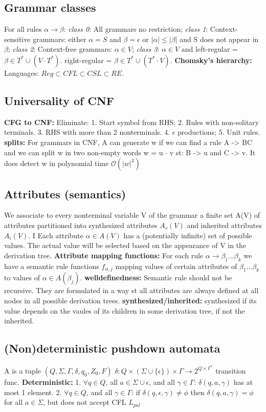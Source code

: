 \subsection*{Grammar classes}
For all rules $\alpha \rightarrow \beta$: \textit{class 0}: All grammars no restriction; \textit{class 1}: Context-sensitive grammars: either $\alpha = S$ and $\beta = \epsilon$ or $|\alpha| \leqslant |\beta|$ and S does not appear in $\beta$; \textit{class 2}: Context-free grammars: $\alpha \in V$; \textit{class 3}: $\alpha \in V$ and left-regular = $\beta \in T^* \cup (V \cdot T^*)$. right-regular = $\beta \in T^* \cup (T^* \cdot V)$. \textbf{Chomsky’s hierarchy:} Languages: $Reg \subset CFL \subset CSL \subset RE$.
\subsection*{Universality of CNF}
\textbf{CFG to CNF:} Eliminate: 1. Start symbol from RHS; 2. Rules with non-solitary terminals. 3. RHS with more than 2 nonterminals. 4. $\epsilon$ productions; 5. Unit rules. \textbf{splits:} For grammars in CNF, A can generate w if we can find a rule A -> BC and we can split w in two non-empty words w = u $\cdot$ v st: B -> u and C -> v. It does detect w in polynomial time $\mathcal{O}(|w|^3)$
\subsection*{Attributes (semantics)}
We associate to every nonterminal variable V of the grammar a finite set A(V) of attributes partitioned into synthesized attributes $A_s(V)$ and inherited attributes $A_i(V)$. I Each attribute $\alpha \in A(V)$ has a (potentially infinite) set of possible values. The actual value will be selected based on the appearance of V in the derivation tree. \textbf{Attribute mapping functions:} For each rule $\alpha \rightarrow \beta_1 ... \beta_k$ we have a semantic rule functions $f_{\alpha,j}$ mapping values of certain attributes of $\beta_1 ... \beta_k$ to values of $\alpha \in A(\beta_j)$. \textbf{welldefinedness:} Semantic rule should not be recursive. They are formulated in a way st all attributes are always defined at all nodes in all possible derivation trees. \textbf{synthesized/inherited:} synthesized if its value depends on the vaules of its children in some derivation tree, if not the inherited.
\subsection*{(Non)deterministic pushdown automata}
A is a tuple $(Q, \Sigma, \Gamma, \delta, q_0, Z_0, F)$ $\delta : Q \times (\Sigma \cup \{\epsilon\}) \times \Gamma \rightarrow 2^{Q\times\Gamma^*}$ transition func. \textbf{Deterministic:} 1. $\forall q \in Q$, all $a \in \Sigma \cup {\epsilon}$, and all $\gamma \in \Gamma$: $\delta(q,a,\gamma)$ has at most 1 element. 2. $\forall q \in Q$, and all $\gamma \in \Gamma$: if $\delta(q,\epsilon,\gamma) \neq \phi$ then $\delta(q,a,\gamma) = \phi$ for all $a \in \Sigma$, but does not accept CFL $L_{pal}$
